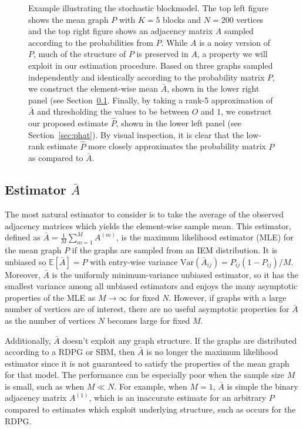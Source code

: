 \documentclass[10pt,letterpaper]{article}
\newcommand{\Ex}{\mathbb{E}}
\begin{document}
\begin{figure}
\begin{subfigure}{.4\textwidth}
\end{subfigure}
\caption{Example illustrating the stochastic blockmodel. The top left figure shows the mean graph $P$ with $K = 5$ blocks and $N=200$ vertices and the top right figure shows an adjacency matrix $A$ sampled according to the probabilities from $P$.
While $A$ is a noisy version of $P$, much of the structure of $P$ is preserved in $A$, a property we will exploit in our estimation procedure.
Based on three graphs sampled independently and identically according to the probability matrix $P$, we construct the element-wise mean $\bar{A}$, shown in the lower right panel (see Section~\ref{sec:abar}.  
Finally, by taking a rank-5 approximation of $\bar{A}$ and thresholding the values to be between $O$ and $1$, we construct our proposed estimate $\hat{P}$, shown in the lower left panel (see Section~\ref{sec:phat}).
By visual inspection, it is clear that the low-rank estimate $\hat{P}$ more closely approximates the probability matrix $P$ as compared to $\bar{A}$.
}
\label{fig:SBM_example}
\end{figure}


\subsection{Estimator $\bar{A}$}
\label{sec:abar}
The most natural estimator to consider is to take the average of the observed adjacency matrices which yields the element-wise sample mean.
This estimator, defined as $\bar{A}=\frac{1}{M}\sum_{m=1}^M A^{(m)}$, is the  maximum likelihood estimator (MLE) for the mean graph $P$ if the graphs are sampled from an IEM distribution.
It is unbiased so $\Ex[\bar{A}]=P$ with entry-wise variance $\mathrm{Var}(\bar{A}_{ij}) = P_{ij} (1-P_{ij})/M$. Moreover, $\bar{A}$ is the uniformly minimum-variance unbiased estimator, so it has the smallest variance among all unbiased estimators and enjoys the many asymptotic properties of the MLE as $M\to \infty$ for fixed $N$.
However, if graphs with a large number of vertices are of interest, there are no useful asymptotic properties for $\bar{A}$ as the number of vertices $N$ becomes large for fixed $M$.

Additionally, $\bar{A}$ doesn't exploit any graph structure.
If the graphs are distributed according to a RDPG or SBM, then $\bar{A}$ is no longer the maximum likelihood estimator since it is not guaranteed to satisfy the properties of the mean graph for that model.
The performance can be especially poor when the sample size $M$ is small, such as when $M\ll N$.
For example, when $M=1$, $\bar{A}$ is simple the binary adjacency matrix $A^{(1)}$, which is an inaccurate estimate for an arbitrary $P$ compared to estimates which exploit underlying structure, such as occurs for the RDPG.
\end{document}
